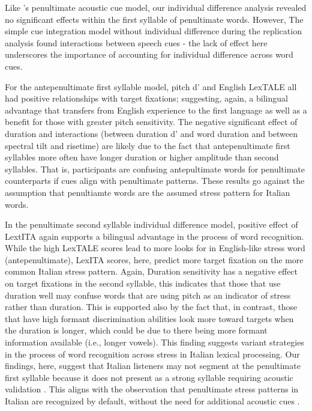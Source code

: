 Like \cite{Sulpizio_McQueen_2012}'s penultimate acoustic cue model, our individual difference analysis revealed no significant effects within the first syllable of penultimate words. However, The simple cue integration model without individual difference during the replication analysis found interactions between speech cues - the lack of effect here underscores the importance of accounting for individual difference across word cues.

For the antepenultimate first syllable model, pitch d' and English LexTALE all had positive relationships with target fixations; suggesting, again, a bilingual advantage that transfers from English experience to the first language as well as a benefit for those with greater pitch sensitivity. The negative significant effect of duration and interactions (between duration d' and word duration and between spectral tilt and risetime) are likely due to the fact that antepenultimate first syllables more often have longer duration or higher amplitude than second syllables. That is, participants are confusing antepultimate words for penultimate counterparts if cues align with penultimate patterns. These results go against the assumption that penultiamte words are the assumed stress pattern for Italian words.

In the penultimate second syllable individual difference model, positive effect of LextITA again supports a bilingual advantage in the process of word recognition. While the high LexTALE scores lead to more looks for in English-like stress word (antepenultimate), LexITA scores, here, predict more target fixation on the more common Italian stress pattern. Again, Duration sensitivity has a negative effect on target fixations in the second syllable, this indicates that those that use duration well may confuse words that are using pitch as an indicator of stress rather than duration. This is supported also by the fact that, in contrast, those that have high formant discrimination abilities look more toward targets when the duration is longer, which could be due to there being more formant information available (i.e., longer vowels). This finding suggests variant strategies in the process of word recognition across stress in Italian lexical processing. Our findings, here, suggest that Italian listeners may not segment at the penultimate first syllable because it does not present as a strong syllable requiring acoustic validation \cite{CutlerNorris1988}. This aligns with the observation that penultimate stress patterns in Italian are recognized by default, without the need for additional acoustic cues \cite{Sulpizio_McQueen_2012}. 


